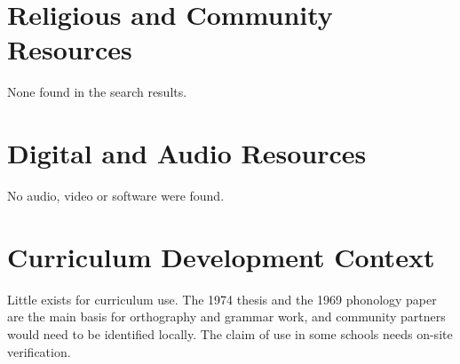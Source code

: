 \documentclass[12pt]{article}
\begin{document}
\section{Religious and Community Resources}
None found in the search results.

\section{Digital and Audio Resources}
No audio, video or software were found.

\section{Curriculum Development Context}
Little exists for curriculum use. The 1974 thesis and the 1969 phonology paper are the main basis for orthography and grammar work, and community partners would need to be identified locally. The claim of use in some schools needs on-site verification.
\end{document}
